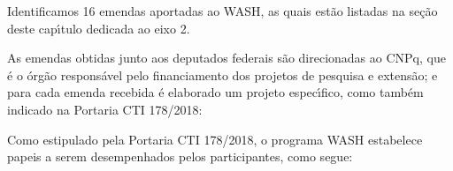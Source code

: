 \documentclass[
12pt,		%
openright,	%
twoside,  %
a4paper,			%
chapter=TITLE,		%
english,			%
french,				%
spanish,			%
brazil				%
]{USPSC-classe/USPSC}
\begin{document}
Identificamos 16 emendas aportadas ao WASH, as quais est\~ao listadas na se\c{c}\~ao deste cap\'{\i}tulo dedicada ao eixo 2.










As emendas obtidas junto aos deputados federais s\~ao direcionadas ao CNPq, que \'e o \'org\~ao respons\'avel pelo financiamento dos projetos de pesquisa e extens\~ao;  e para cada emenda recebida \'e elaborado um projeto espec\'{\i}fico, como tamb\'em indicado na Portaria CTI 178/2018:











\noindent\begin{center}\mbox{\centering{}}\end{center}


Como estipulado pela Portaria CTI 178/2018, o programa WASH estabelece papeis a serem desempenhados pelos participantes, como segue:
\end{document}
